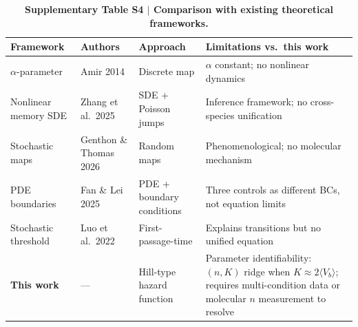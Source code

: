 \documentclass[11pt]{article}
\begin{document}
\begin{table}[H]
\centering
\caption{\textbf{Supplementary Table S4 $|$ Comparison with existing
theoretical frameworks.}}
\small
\begin{tabular}{p{2.5cm}p{2.2cm}p{3.5cm}p{4.2cm}}
\toprule
\textbf{Framework} & \textbf{Authors} & \textbf{Approach}
  & \textbf{Limitations vs.\ this work} \\
\midrule
$\alpha$-parameter & Amir 2014 & Discrete map &
  $\alpha$ constant; no nonlinear dynamics \\
\addlinespace
Nonlinear memory SDE & Zhang et al.\ 2025 & SDE + Poisson jumps &
  Inference framework; no cross-species unification \\
\addlinespace
Stochastic maps & Genthon \& Thomas 2026 & Random maps &
  Phenomenological; no molecular mechanism \\
\addlinespace
PDE boundaries & Fan \& Lei 2025 & PDE + boundary conditions &
  Three controls as different BCs, not equation limits \\
\addlinespace
Stochastic threshold & Luo et al.\ 2022 & First-passage-time &
  Explains transitions but no unified equation \\
\addlinespace
\textbf{This work} & --- & Hill-type hazard function &
  Parameter identifiability: $(n, K)$ ridge when
  $K \approx 2\langle V_b\rangle$; requires multi-condition
  data or molecular $n$ measurement to resolve \\
\bottomrule
\end{tabular}
\end{table}
\end{document}
